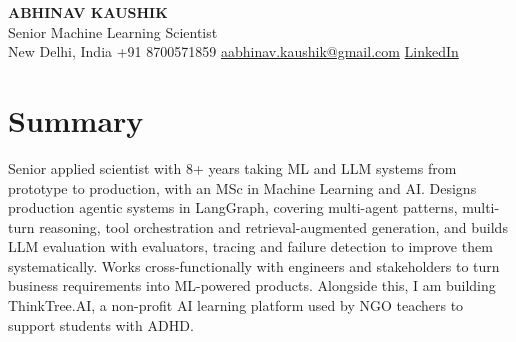 \documentclass[10pt,a4paper]{article}
\begin{document}
\begin{center}
  {\LARGE\bfseries ABHINAV KAUSHIK}\\[2pt]
  {\large Senior Machine Learning Scientist}\\[2pt]
  New Delhi, India \textbar{} +91 8700571859 \textbar{} \href{mailto:aabhinav.kaushik@gmail.com}{aabhinav.kaushik@gmail.com} \textbar{} \href{https://www.linkedin.com/in/abhinav-kaushik10/}{LinkedIn}  
\end{center}

\section{Summary}
Senior applied scientist with 8+ years taking ML and LLM systems from prototype to production, with an MSc in Machine Learning and AI. Designs production agentic systems in LangGraph, covering multi-agent patterns, multi-turn reasoning, tool orchestration and retrieval-augmented generation, and builds LLM evaluation with evaluators, tracing and failure detection to improve them systematically. Works cross-functionally with engineers and stakeholders to turn business requirements into ML-powered products. Alongside this, I am building ThinkTree.AI, a non-profit AI learning platform used by NGO teachers to support students with ADHD.
\end{document}
